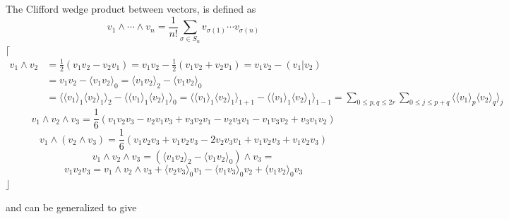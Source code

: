 \documentclass[aps, preprint]{revtex4}
\begin{document}
The Clifford wedge product between vectors, is defined as
\begin{equation}v_{1} \wedge \cdots  \wedge v_{n} =\frac{1}{n !} \sum _{\sigma  \in S_{n}}v_{\sigma  \left (1\right )} \cdots  v_{\sigma  \left (n\right )}
\end{equation}$\lceil $
\begin{align}v_{1} \wedge v_{2} &  =\frac{1}{2} \left (v_{1} v_{2} -v_{2} v_{1}\right ) =v_{1} v_{2} -\frac{1}{2} \left (v_{1} v_{2} +v_{2} v_{1}\right ) =v_{1} v_{2} -\left (\left .v_{1}\right \vert v_{2}\right ) \\
 &  =v_{1} v_{2} - \langle v_{1} v_{2} \rangle _{0} = \langle v_{1} v_{2} \rangle _{2} - \langle v_{1} v_{2} \rangle _{0} \\
 &  = \langle  \langle v_{1} \rangle _{1}  \langle v_{2} \rangle _{1} \rangle _{2} - \langle  \langle v_{1} \rangle _{1}  \langle v_{2} \rangle _{1} \rangle _{0} = \langle  \langle v_{1} \rangle _{1}  \langle v_{2} \rangle _{1} \rangle _{1 +1} - \langle  \langle v_{1} \rangle _{1}  \langle v_{2} \rangle _{1} \rangle _{1 -1} =\sum _{0 \leq p ,q \leq 2 r}\sum _{0 \leq j \leq p +q} \langle  \langle v_{1} \rangle _{p}  \langle v_{2} \rangle _{q} \rangle _{j}\end{align}
\begin{equation*}v_{1} \wedge v_{2} \wedge v_{3} =\frac{1}{6} \left (v_{1} v_{2} v_{3} -v_{2} v_{1} v_{3} +v_{3} v_{2} v_{1} -v_{2} v_{3} v_{1} -v_{1} v_{3} v_{2} +v_{3} v_{1} v_{2}\right )
\end{equation*}
\begin{equation*}v_{1} \wedge \left (v_{2} \wedge v_{3}\right ) =\frac{1}{6} \left (v_{1} v_{2} v_{3} +v_{1} v_{2} v_{3} -2 v_{2} v_{3} v_{1} +v_{1} v_{2} v_{3} +v_{1} v_{2} v_{3}\right )
\end{equation*}
\begin{equation}v_{1} \wedge v_{2} \wedge v_{3} =\left ( \langle v_{1} v_{2} \rangle _{2} - \langle v_{1} v_{2} \rangle _{0}\right ) \wedge v_{3} =
\end{equation}
\begin{equation}v_{1} v_{2} v_{3} =v_{1} \wedge v_{2} \wedge v_{3} + \langle v_{2} v_{3} \rangle _{0} v_{1} - \langle v_{1} v_{3} \rangle _{0} v_{2} + \langle v_{1} v_{2} \rangle _{0} v_{3}
\end{equation}$\rfloor $ 

and can be generalized to give 
\end{document}

